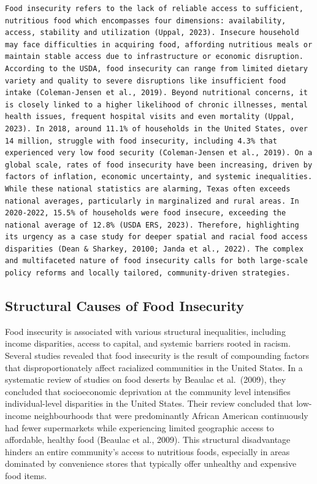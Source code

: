 \documentclass[]{article}
\begin{document}
\begin{verbatim}
Food insecurity refers to the lack of reliable access to sufficient, nutritious food which encompasses four dimensions: availability, access, stability and utilization (Uppal, 2023). Insecure household may face difficulties in acquiring food, affording nutritious meals or maintain stable access due to infrastructure or economic disruption. According to the USDA, food insecurity can range from limited dietary variety and quality to severe disruptions like insufficient food intake (Coleman-Jensen et al., 2019). Beyond nutritional concerns, it is closely linked to a higher likelihood of chronic illnesses, mental health issues, frequent hospital visits and even mortality (Uppal, 2023). In 2018, around 11.1% of households in the United States, over 14 million, struggle with food insecurity, including 4.3% that experienced very low food security (Coleman-Jensen et al., 2019). On a global scale, rates of food insecurity have been increasing, driven by factors of inflation, economic uncertainty, and systemic inequalities. While these national statistics are alarming, Texas often exceeds national averages, particularly in marginalized and rural areas. In 2020-2022, 15.5% of households were food insecure, exceeding the national average of 12.8% (USDA ERS, 2023). Therefore, highlighting its urgency as a case study for deeper spatial and racial food access disparities (Dean & Sharkey, 20100; Janda et al., 2022). The complex and multifaceted nature of food insecurity calls for both large-scale policy reforms and locally tailored, community-driven strategies.
\end{verbatim}

\subsection{Structural Causes of Food
Insecurity}\label{structural-causes-of-food-insecurity}

Food insecurity is associated with various structural inequalities,
including income disparities, access to capital, and systemic barriers
rooted in racism. Several studies revealed that food insecurity is the
result of compounding factors that disproportionately affect racialized
communities in the United States. In a systematic review of studies on
food deserts by Beaulac et al.~(2009), they concluded that socioeconomic
deprivation at the community level intensifies individual-level
disparities in the United States. Their review concluded that low-income
neighbourhoods that were predominantly African American continuously had
fewer supermarkets while experiencing limited geographic access to
affordable, healthy food (Beaulac et al., 2009). This structural
disadvantage hinders an entire community's access to nutritious foods,
especially in areas dominated by convenience stores that typically offer
unhealthy and expensive food items.
\end{document}
